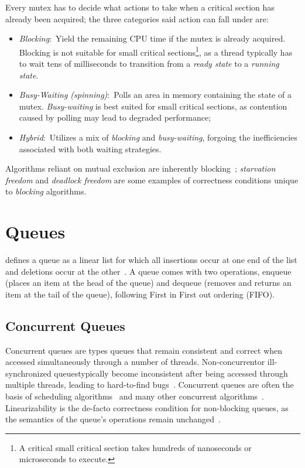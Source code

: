 Every mutex has to decide what actions to take when a critical section has
already been acquired; the three categories said action can fall under are: 
\begin{itemize}
\item \emph{Blocking}:~Yield the remaining CPU time if the mutex is already acquired.
Blocking is not suitable for small critical sections\footnote{A critical
small critical section takes hundreds of nanoseconds or microseconds to
execute.}, as a thread typically has to wait tens of milliseconds to transition
from a \emph{ready state} to a \emph{running state}.
\item \emph{Busy-Waiting (spinning)}:~Polls an area in memory containing the
state of a mutex. \emph{Busy-waiting} is best suited for small critical sections, as
contention caused by polling may lead to degraded performance;
\item \emph{Hybrid}:~Utilizes a mix of \emph{blocking} and \emph{busy-waiting},
forgoing the inefficiencies associated with both waiting strategies.
\end{itemize}

Algorithms reliant on mutual exclusion are inherently
blocking~\citep[Section~3.8]{herlihy2020art}; \emph{starvation freedom} and
\emph{deadlock freedom} are some examples of correctness conditions unique to
\emph{blocking} algorithms.


\section{Queues}
\citeauthor{knuth1968art} defines a queue as a linear list for which all
insertions occur at one end of the list and deletions occur at the
other~\citep{knuth1968art}. A queue comes with two operations, enqueue (places
an item at the head of the queue) and dequeue (removes and returns an item at
the tail of the queue), following First in First out ordering (FIFO).

\subsection{Concurrent Queues}
Concurrent queues are types queues that remain consistent and correct when
accessed simultaneously through a number of threads. Non-concurrent\textemdash or
ill-synchronized queues\textemdash typically become inconsistent after being
accessed through multiple threads, leading
to hard-to-find bugs~\citep{yahav2003automatically}. Concurrent queues are often the basis of scheduling
algorithms~\citep{debattista2002high} and many other concurrent
algorithms~\citep{yahav2003automatically}. Linearizability is the de-facto correctness condition
for non-blocking queues, as the semantics of the queue's
operations remain unchanged~\citep{mellor1987concurrent, valois1995datastructures}.

